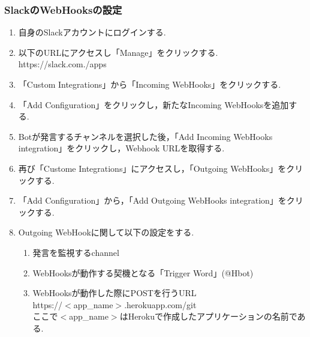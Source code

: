 \documentclass[fleqn, 14pt]{sty/extarticlej}
\begin{document}
\subsubsection{SlackのWebHooksの設定}
\begin{enumerate}
\item 自身のSlackアカウントにログインする.
\item 以下のURLにアクセスし「Manage」をクリックする.\\
  https://slack.com./apps
\item 「Custom Integrations」から「Incoming WebHooks」をクリックする.
\item 「Add Configuration」をクリックし，新たなIncoming WebHooksを追加する.
\item Botが発言するチャンネルを選択した後，「Add Incoming WebHooks integration」をクリックし，Webhook URLを取得する.
\item 再び「Custome Integrations」にアクセスし，「Outgoing WebHooks」をクリックする.
\item 「Add Configuration」から，「Add Outgoing WebHooks integration」をクリックする.
\item Outgoing WebHookに関して以下の設定をする.
  \begin{enumerate}
  \item 発言を監視するchannel
  \item WebHooksが動作する契機となる「Trigger Word」(@Hbot)
  \item WebHooksが動作した際にPOSTを行うURL\\
    https://$<$app\_name$>$.herokuapp.com/git\\
    ここで$<$app\_name$>$はHerokuで作成したアプリケーションの名前である.
  \end{enumerate}
\end{enumerate}
\end{document}
